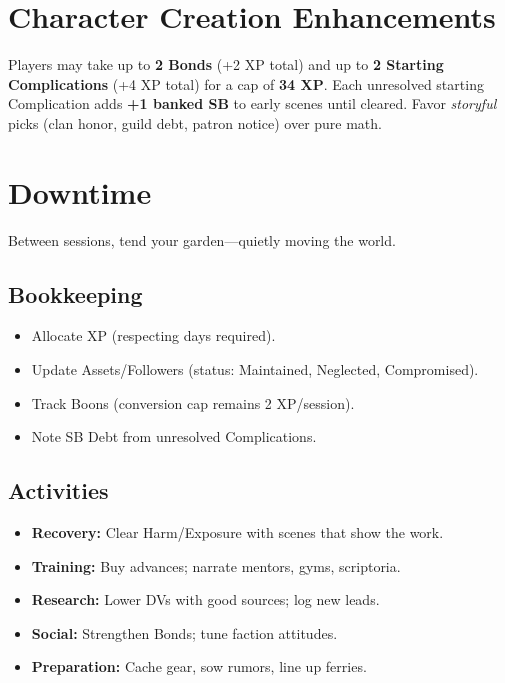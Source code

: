 \section{Character Creation Enhancements}

Players may take up to \textbf{2 Bonds} (+2 XP total) and up to \textbf{2 Starting Complications} (+4 XP total) for a cap of \textbf{34 XP}. Each unresolved starting Complication adds \textbf{+1 banked SB} to early scenes until cleared. Favor \emph{storyful} picks (clan honor, guild debt, patron notice) over pure math.

\section{Downtime}

Between sessions, tend your garden—quietly moving the world.

\subsection{Bookkeeping}
\begin{itemize}
  \item Allocate XP (respecting days required).%
  \item Update Assets/Followers (status: Maintained, Neglected, Compromised).%
  \item Track Boons (conversion cap remains 2 XP/session).%
  \item Note SB Debt from unresolved Complications.%
\end{itemize}

\subsection{Activities}
\begin{itemize}
  \item \textbf{Recovery:} Clear Harm/Exposure with scenes that show the work.%
  \item \textbf{Training:} Buy advances; narrate mentors, gyms, scriptoria.%
  \item \textbf{Research:} Lower DVs with good sources; log new leads.%
  \item \textbf{Social:} Strengthen Bonds; tune faction attitudes.%
  \item \textbf{Preparation:} Cache gear, sow rumors, line up ferries.%
\end{itemize}

